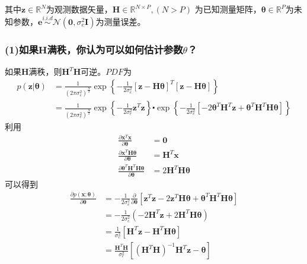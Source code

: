 \documentclass[fontset=windows]{article}
\numberwithin{figure}{section}
\begin{document}
其中\(\mathbf{z}\in \mathbb{R}^N\)为观测数据矢量，\(\mathbf{H}\in \mathbb{R}^{N\times P},(N>P)\)
为已知测量矩阵，\(\boldsymbol{\theta}\in \mathbb{R} ^P\)为未知参数，\(\mathbf{e}\overset{i.i.d}{\sim}
\mathcal{N}(\mathbf{0},\sigma^2_e \mathbf{I})\)为测量误差。

\subsubsection*{(1)如果\(\mathbf{H}\)满秩，你认为可以如何估计参数\(\theta\)？}

如果\(\mathbf{H}\)满秩，则\(\mathbf{H}^T \mathbf{H}\)可逆。\(PDF\)为
\begin{align*}
	p(\mathbf{z}|\boldsymbol{\theta})
	 & =\frac{1}{(2\pi \sigma_e^2)^{\frac{N}{2}}}
	\exp\left\{-\frac{1}{2\sigma_e^2} \left[\mathbf{z-H}\boldsymbol{\theta}\right]^T
	\left[\mathbf{z-H}\boldsymbol{\theta}\right]\right\} \\
	 & =\frac{1}{(2\pi \sigma_e^2)^{\frac{N}{2}}}
	\exp\left\{-\frac{1}{2\sigma_e^2} \mathbf{z}^T \mathbf{z}\right\}\centerdot
	\exp\left\{-\frac{1}{2\sigma_e^2} \left[-2\boldsymbol{\theta}^T\mathbf{H}^T\mathbf{z}
		+\boldsymbol{\theta}^T\mathbf{H}^T\mathbf{H}\boldsymbol{\theta}\right]\right\}
\end{align*}
利用
\begin{align*}
	\frac{\partial \mathbf{x}^T \mathbf{x}}{\partial \mathbf{\boldsymbol{\theta}}}
	 & =\mathbf{0}                                  \\
	\frac{\partial \mathbf{x}^T \mathbf{H}\boldsymbol{\theta}}{\partial \boldsymbol{\theta}}
	 & =\mathbf{H}^T \mathbf{x}                     \\
	\frac{\partial \boldsymbol{\theta}^T \mathbf{H}^T\mathbf{H}\boldsymbol{\theta}}{\partial \boldsymbol{\theta}}
	 & =2\mathbf{H}^T \mathbf{H}\boldsymbol{\theta}
\end{align*}
可以得到
\begin{align*}
	\frac{\partial p(\mathbf{x};\boldsymbol{\theta})}{\partial \boldsymbol{\theta}}
	 & =- \frac{1}{2\sigma_e^2} \frac{\partial}{\partial \boldsymbol{\theta}}
	[\mathbf{z}^T \mathbf{z}- 2\mathbf{z}^T \mathbf{H} \boldsymbol{\theta}
	+\boldsymbol{\theta}^T \mathbf{H}^T \mathbf{H} \boldsymbol{\theta}]                                                    \\
	 & =- \frac{1}{2\sigma_e^2}(-2\mathbf{H}^T \mathbf{z}+2\mathbf{H}^T \mathbf{H} \boldsymbol{\theta})                    \\
	 & =\frac{1}{\sigma_e^2}[\mathbf{H}^T \mathbf{z}-\mathbf{H}^T \mathbf{H}\boldsymbol{\theta}]                           \\
	 & =\frac{\mathbf{H}^T\mathbf{H}}{\sigma_e^2}[(\mathbf{H}^T\mathbf{H})^{-1}\mathbf{H}^T\mathbf{z}-\boldsymbol{\theta}]
\end{align*}
\end{document}
